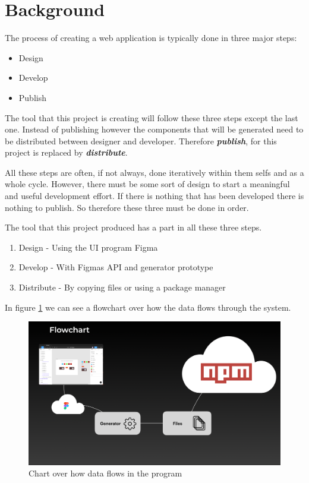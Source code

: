 \section{Background}

The process of creating a web application is typically done in three major steps: 
\begin{itemize}
  \item Design
  \item Develop
  \item Publish
\end{itemize}

The tool that this project is creating will follow these three steps except the last one. Instead of publishing however the components that will be generated need to be distributed between designer and developer. Therefore \textbf{\textit{publish}}, for this project is replaced by \textbf{\textit{distribute}}.

All these steps are often, if not always, done iteratively within them selfs and as a whole cycle. However, there must be some sort of design to start a meaningful and useful development effort. If there is nothing that has been developed there is nothing to publish. So therefore these three must be done in order. 

The tool that this project produced has a part in all these three steps.
\begin{enumerate}
  \item Design - Using the UI program Figma
  \item Develop - With Figmas API and generator prototype 
  \item Distribute - By copying files or using a package manager
\end{enumerate}

In figure \ref{fig:flow} we can see a flowchart over how the data flows through the system.

\begin{figure}[H]
  \centering
  \includegraphics[width=0.8\linewidth]{images/flow.png}
  \caption{Chart over how data flows in the program}%
  \label{fig:flow}
\end{figure}



